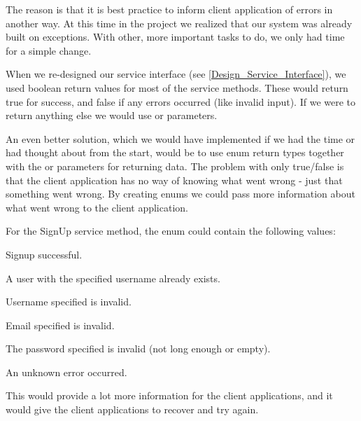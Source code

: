 The reason is that it is best practice to inform client application of errors in another way. At this time in the project we realized that our system was already built on exceptions. With other, more important tasks to do, we only had time for a simple change.

When we re-designed our service interface (see \ref{Design_Service_Interface}), we used boolean return values for most of the service methods. These would return true for success, and false if any errors occurred (like invalid input). If we were to return anything else we would use  or  parameters.

An even better solution, which we would have implemented if we had the time or had thought about from the start, would be to use enum return types together with the  or  parameters for returning data. The problem with only true/false is that the client application has no way of knowing what went wrong - just that something went wrong. By creating enums we could pass more information about what went wrong to the client application.

For the SignUp service method, the enum could contain the following values:

\begin{my_description}
\item[Success] Signup successful.
\item[UsernameInUse] A user with the specified username already exists.
\item[InvalidUsername] Username specified is invalid.
\item[InvalidEmail] Email specified is invalid.
\item[InvalidPassword] The password specified is invalid (not long enough or empty).
\item[Error] An unknown error occurred.
\end{my_description}

This would provide a lot more information for the client applications, and it would give the client applications to recover and try again.
